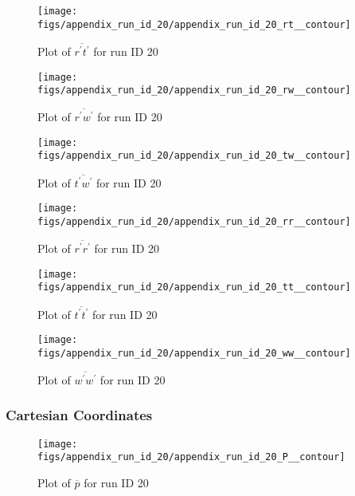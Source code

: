 \begin{figure}[H]
\centering
\texttt{[image: figs/appendix\_run\_id\_20/appendix\_run\_id\_20\_rt\_\_contour]}
\caption{Plot of $\overline{r^\prime t^\prime}$ for run ID 20}
\label{fig:appendix_run_id_20_rt__contour}
\end{figure}


\begin{figure}[H]
\centering
\texttt{[image: figs/appendix\_run\_id\_20/appendix\_run\_id\_20\_rw\_\_contour]}
\caption{Plot of $\overline{r^\prime w^\prime}$ for run ID 20}
\label{fig:appendix_run_id_20_rw__contour}
\end{figure}


\begin{figure}[H]
\centering
\texttt{[image: figs/appendix\_run\_id\_20/appendix\_run\_id\_20\_tw\_\_contour]}
\caption{Plot of $\overline{t^\prime w^\prime}$ for run ID 20}
\label{fig:appendix_run_id_20_tw__contour}
\end{figure}


\begin{figure}[H]
\centering
\texttt{[image: figs/appendix\_run\_id\_20/appendix\_run\_id\_20\_rr\_\_contour]}
\caption{Plot of $\overline{r^\prime r^\prime}$ for run ID 20}
\label{fig:appendix_run_id_20_rr__contour}
\end{figure}


\begin{figure}[H]
\centering
\texttt{[image: figs/appendix\_run\_id\_20/appendix\_run\_id\_20\_tt\_\_contour]}
\caption{Plot of $\overline{t^\prime t^\prime}$ for run ID 20}
\label{fig:appendix_run_id_20_tt__contour}
\end{figure}


\begin{figure}[H]
\centering
\texttt{[image: figs/appendix\_run\_id\_20/appendix\_run\_id\_20\_ww\_\_contour]}
\caption{Plot of $\overline{w^\prime w^\prime}$ for run ID 20}
\label{fig:appendix_run_id_20_ww__contour}
\end{figure}


\subsubsection{Cartesian Coordinates}
\begin{figure}[H]
\centering
\texttt{[image: figs/appendix\_run\_id\_20/appendix\_run\_id\_20\_P\_\_contour]}
\caption{Plot of $\overline{p}$ for run ID 20}
\label{fig:appendix_run_id_20_P__contour}
\end{figure}


